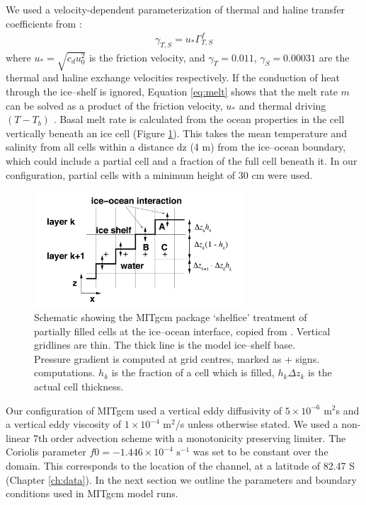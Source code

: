 We used a velocity-dependent parameterization of thermal and haline transfer coefficients from \cite{holland1999modeling}:
\begin{align}
    \gamma_{T,S} = u_* \Gamma^f_{T,S}
\end{align}
where $u_* = \sqrt{c_d u^2_0}$ is the friction velocity, and $\gamma_{T}=0.011$, $\gamma_{S}=0.00031$ are the thermal and haline exchange velocities respectively. 
If the conduction of heat through the ice--shelf is ignored, Equation \ref{eq:melt} shows that the melt rate $m$ can be solved as a product of the friction velocity, $u_*$ and thermal driving $(T - T_b)$ \citep{holland2008response}. Basal melt rate is calculated from the ocean properties in the cell vertically beneath an ice cell (Figure \ref{fig:melt_cells}). This takes the mean temperature and salinity from all cells within a distance dz (4 m) from the ice--ocean boundary, which could include a partial cell and a fraction of the full cell beneath it. In our configuration, partial cells with a minimum height of 30 cm were used.
\begin{figure}[!ht]
\centering
\includegraphics[width=0.7\textwidth]{chapters/4/melt_cells.png}
\caption[Melt schematic]{ Schematic showing the MITgcm package
`shelfice' treatment of partially filled cells at the ice--ocean interface, copied from \cite{losch2008modeling}. Vertical gridlines are thin. The thick line is the model ice--shelf base.
Pressure gradient is computed at grid centres, marked as $+$ signs. computations. $h_k$ is the fraction of a cell which is filled, $h_k \Delta z_k$ is the actual cell thickness.}
\label{fig:melt_cells}
\end{figure}

Our configuration of MITgcm used a vertical eddy diffusivity of  $5 \times 10^{-6}$ $\mathrm{m}^2$s and a vertical eddy viscosity of $1 \times 10^{-4}$ $\mathrm{m}^2$/s unless otherwise stated. We used a non-linear 7th order advection scheme with a monotonicity preserving limiter.
The Coriolis parameter $f0 = -1.446 \times 10^{-4}$ $\mathrm{s}^{-1}$ was set to be constant over the domain. This corresponds to the location of the channel, at a latitude of 82.47 S (Chapter  \ref{ch:data}). 
In the next section we outline the parameters and boundary conditions used in MITgcm model runs.

